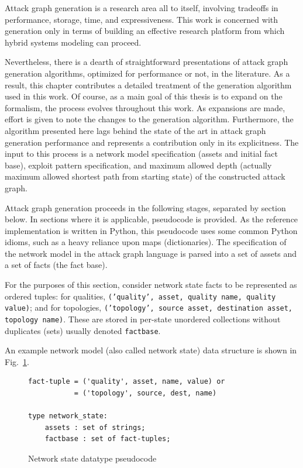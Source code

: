 Attack graph generation is a research area all to itself,
involving tradeoffs in performance, storage, time, and expressiveness.
This work is concerned with generation only
in terms of building an effective research platform from which hybrid systems
modeling can proceed.

Nevertheless, there is a dearth of straightforward presentations of attack 
graph generation algorithms, optimized for performance or not, in the 
literature. As a result, this chapter contributes a detailed treatment of the
generation algorithm used in this work. Of course, as a main goal of this
thesis is to expand on the formalism, the process evolves throughout this
work. As expansions are made, effort is given to note the changes to the
generation algorithm. Furthermore, the algorithm presented here lags behind the
state of the art in attack graph generation performance and represents a
contribution only in its explicitness.
The input to this
process is a network model specification (assets and initial fact base),
exploit pattern specification, and maximum allowed depth (actually maximum
allowed shortest path from starting state) of the constructed attack graph.

Attack graph generation proceeds in the following stages, separated by
section below. In sections where it is applicable, pseudocode is provided. 
As the reference
implementation is written in Python, this pseudocode uses some common Python
idioms, such as a heavy reliance upon maps (dictionaries).
The specification of the network model in the attack graph language is
parsed into a set of assets and a set of facts (the fact base). 

For the purposes
of this section, consider network state facts to be represented as ordered
tuples: for qualities, \texttt{('quality', asset, quality name, quality value)};
and for topologies, \texttt{('topology', source asset, destination asset,
topology name)}. These are stored in per-state unordered collections without duplicates
(sets) usually denoted \texttt{factbase}.

An example network model (also called network state) data structure is shown in
Fig.~\ref{fig:netstate_pc}.

\begin{figure}
\begin{lstlisting}
fact-tuple = ('quality', asset, name, value) or
           = ('topology', source, dest, name)

type network_state:
    assets : set of strings;
    factbase : set of fact-tuples;
\end{lstlisting}
\caption{Network state datatype pseudocode}
\label{fig:netstate_pc}
\end{figure}

